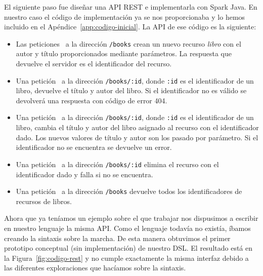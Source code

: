 \documentclass[runningheads]{llncs}
\begin{document}
El siguiente paso fue diseñar una API REST e implementarla con
Spark Java. En nuestro caso el código de implementación
ya se nos proporcionaba y lo hemos incluido en el
Apéndice~\ref{app:codigo-inicial}. La API de ese código es la siguiente:

\begin{itemize}
    \item Las peticiones \POST\ a la dirección
        \texttt{/books} crean un nuevo recurso \emph{libro} con el autor
        y título proporcionados mediante parámetros. La respuesta
        que devuelve el servidor es el identificador del recurso.
    \item Una petición \GET\ a la dirección \texttt{/books/:id}, donde
        \texttt{:id} es el identificador de un libro, devuelve el título
        y autor del libro. Si el identificador no es válido se devolverá
        una respuesta con código de error 404.
    \item Una petición \PUT\ a la dirección \texttt{/books/:id}, donde
        \texttt{:id} es el identificador de un libro, cambia el título
        y autor del libro asignado al recurso con el identificador dado. Los
        nuevos valores de título y autor son los pasado por parámetro. Si
        el identificador no se encuentra se devuelve un error.
    \item Una petición \DELETE\ a la dirección \texttt{/books/:id}
        elimina el recurso con el identificador dado y falla si no
        se encuentra.
    \item Una petición \GET\ a la dirección \texttt{/books} devuelve todos
        los identificadores de recursos de libros.
\end{itemize}

Ahora que ya teníamos un ejemplo sobre el que trabajar nos dispusimos
a escribir en nuestro lenguaje la misma API. Como el lenguaje todavía
no existía, íbamos creando la sintaxis sobre la marcha. De esta manera
obtuvimos el primer prototipo conceptual (sin implementación) de nuestro
DSL. El resultado está en la Figura~\ref{fig:codigo-rest} y no cumple
exactamente la misma interfaz debido a las diferentes exploraciones que
hacíamos sobre la sintaxis.

\end{document}
